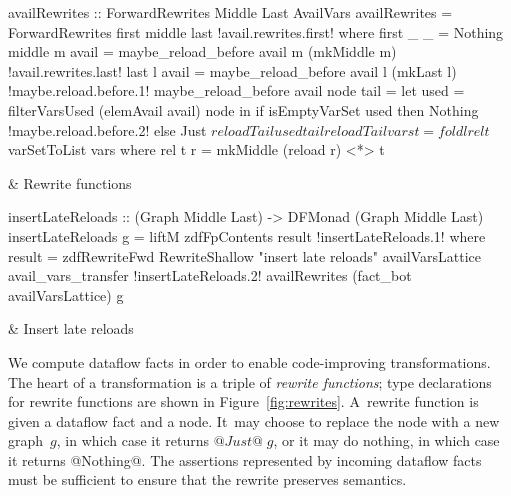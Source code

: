 \documentclass[blockstyle,preprint,nocopyrightspace]{sigplanconf}
\newcommand\figref[1]{Figure~\ref{fig:#1}}
\newcommand\figlabel[1]{\label{fig:#1}}
\begin{document}
\begin{figure*}
\begin{codetable}
\T\begin{code}
availRewrites :: ForwardRewrites Middle Last AvailVars
availRewrites = ForwardRewrites first middle last
!avail.rewrites.first!  where first _ _ = Nothing
        middle m avail = maybe_reload_before avail m (mkMiddle m)
!avail.rewrites.last!        last   l avail = maybe_reload_before avail l (mkLast l)
!maybe.reload.before.1!        maybe_reload_before avail node tail =
            let used = filterVarsUsed (elemAvail avail) node
            in  if isEmptyVarSet used then Nothing
!maybe.reload.before.2!                else Just $ reloadTail used tail
        reloadTail vars t = foldl rel t $ varSetToList vars
          where rel t r = mkMiddle (reload r) <*> t
\end{code}%
\B
& Rewrite \mbox{functions}\\
\hline

\T\begin{code}
insertLateReloads :: (Graph Middle Last) -> DFMonad (Graph Middle Last)
insertLateReloads g = liftM zdfFpContents result
!insertLateReloads.1!  where result = zdfRewriteFwd RewriteShallow "insert late reloads"
                               availVarsLattice avail_vars_transfer
!insertLateReloads.2!                               availRewrites (fact_bot availVarsLattice) g
\end{code}%
& Insert late reloads\\
\end{codetable}
\caption{Late-reload insertion, which relies on the analysis of \figref{avail}}
\figlabel{avail-rewrites}
\end{figure*}


We compute dataflow facts in order to enable code-improving
transformations.
The heart of a transformation is a triple of
\emph{rewrite functions};
type declarations for rewrite functions are
shown in \figref{rewrites}. 
%
A~rewrite function is given a dataflow fact and a node.
It~may choose to replace the node with a new graph~$g$, in which case it
returns $@Just@\;g$, or it may do nothing, in which case it returns @Nothing@.
The assertions represented by incoming dataflow facts must be
sufficient to ensure that the
rewrite preserves semantics.
\end{document}
